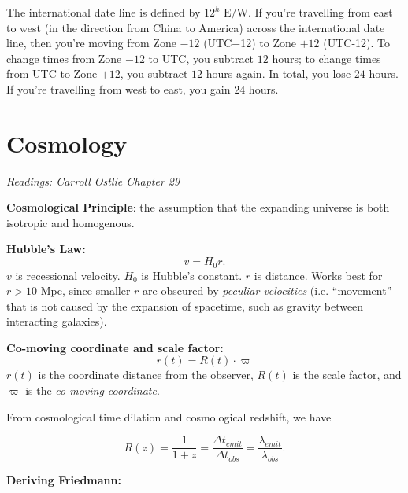 \documentclass[11pt]{article}
\newcommand{\V}{

\vspace{\baselineskip}

}
\begin{document}



The international date line is defined by $12^{h}\text{ E/W}$. If you're travelling from east to west (in the direction from China to America) across the international date line, then you're moving from Zone $-12$ (UTC+12) to Zone $+12$ (UTC-12). To change times from Zone $-12$ to UTC, you subtract $12$ hours; to change times from UTC to Zone $+12$, you subtract $12$ hours again. In total, you lose $24$ hours. If you're travelling from west to east, you gain $24$ hours.

\section{Cosmology}

\textit{Readings: Carroll Ostlie Chapter 29}\V

\textbf{Cosmological Principle}: the assumption that the expanding universe is both isotropic and homogenous.\V

\textbf{Hubble's Law:} 
\begin{equation*}
    v = H_0r.
\end{equation*}
$v$ is recessional velocity. $H_0$ is Hubble's constant. $r$ is distance. Works best for $r > 10$ Mpc, since smaller $r$ are obscured by \textit{peculiar velocities} (i.e. ``movement'' that is not caused by the expansion of spacetime, such as gravity between interacting galaxies). \V

\textbf{Co-moving coordinate and scale factor:}
\begin{equation*}
    r(t) = R(t)\cdot \varpi
\end{equation*}
$r(t)$ is the coordinate distance from the observer, $R(t)$ is the scale factor, and $\varpi$ is the \textit{co-moving coordinate}.

From cosmological time dilation and cosmological redshift, we have

\[R(z) = \frac{1}{1+z} = \frac{\Delta t_{emit}}{\Delta t_{obs}} = \frac{\lambda_{emit}}{\lambda_{obs}}.\]\V

\textbf{Deriving Friedmann:}
\end{document}
